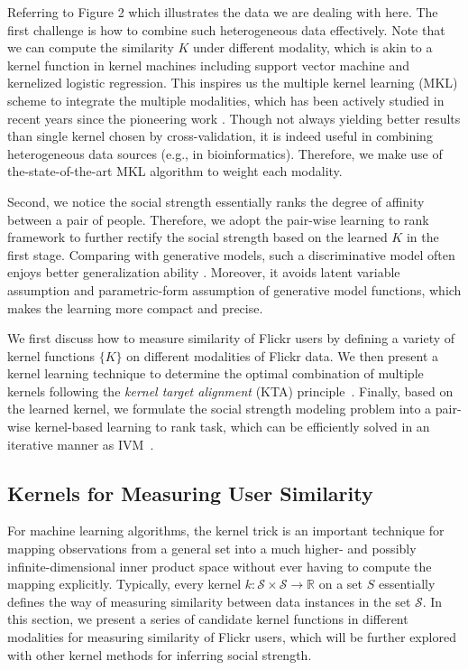 Referring to Figure 2 which illustrates the data we are dealing with here. The first challenge is how to combine such heterogeneous data effectively. Note that we can compute the similarity $K$ under different modality, which is akin to a kernel function in kernel machines including support vector machine and kernelized logistic
regression. This inspires us the multiple kernel learning (MKL) scheme to integrate the multiple modalities, which has been actively studied in recent years
since the pioneering work \cite{jmlr/LanckrietCBGJ03}. Though not always yielding better results than single kernel chosen by cross-validation\cite{icml/Cortes09}, it is indeed
useful in combining heterogeneous data sources (e.g., in bioinformatics\cite{bmcbi/YuFDTSMM10}). Therefore, we make use of the-state-of-the-art MKL algorithm \cite{icml/CortesMR10} to weight each modality.

Second, we notice the social strength essentially ranks the degree of affinity between a pair of people. Therefore, we adopt the pair-wise learning to rank framework to further rectify the social strength based on the learned $K$ in the first stage. Comparing with generative models, such a discriminative model often enjoys better generalization ability \cite{Vapnik98}. Moreover, it avoids latent variable assumption and parametric-form assumption of generative model functions, which makes
the learning more compact and precise.

We first discuss how to measure similarity of Flickr users by defining a variety of kernel functions $\{K\}$ on different modalities of Flickr data. We then present a kernel learning technique to determine the optimal combination of multiple kernels following the {\em kernel target alignment} (KTA)
principle~\cite{icml/CortesMR10,nips/CristianiniSEK01}. Finally, based on the learned kernel, we formulate the social strength modeling problem into a pair-wise
kernel-based learning to rank task, which can be efficiently solved in an iterative manner as IVM~\cite{nips/ZhuH01}.

\subsection{Kernels for Measuring User Similarity} \label{sec:ssm-kernel}

For machine learning algorithms, the kernel trick is an important technique for mapping observations from a general set into a much higher- and possibly
infinite-dimensional inner product space without ever having to compute the mapping explicitly. Typically, every kernel $k:\mathcal S\times \mathcal S\rightarrow \mathbb{R}$ on a
set $S$ essentially defines the way of measuring similarity between data instances in the set $\mathcal S$. In this section, we present a series of candidate kernel
functions in different modalities for measuring similarity of Flickr users, which will be further explored with other kernel methods for inferring social
strength.

